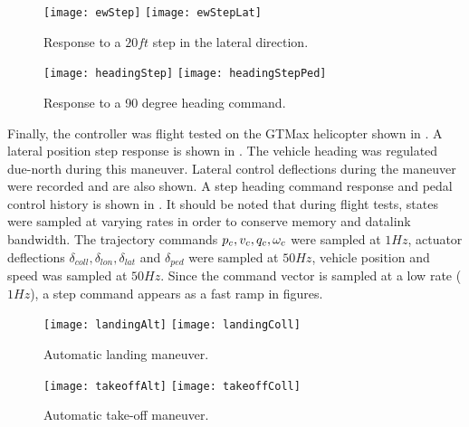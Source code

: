 \begin{figure}
  \begin{center}
  \texttt{[image: ewStep]}
  \texttt{[image: ewStepLat]}
  \caption{Response to a $20 ft$ step in the lateral direction.}
  \label{f:ewStep}
  \end{center}
\end{figure}
%
\begin{figure}
  \begin{center}
  \texttt{[image: headingStep]}
  \texttt{[image: headingStepPed]}
  \caption{Response to a 90 degree heading command.}
  \label{f:headingStep}
  \end{center}
\end{figure}
Finally, the controller was flight tested on the GTMax helicopter
shown in . A lateral position step response is shown
in .  The vehicle heading was regulated due-north
during this maneuver. Lateral control deflections during the
maneuver were recorded and are also shown. A step heading command
response and pedal control history is shown in . It should be noted that during
flight tests, states were sampled at varying rates in order to
conserve memory and datalink bandwidth. The trajectory commands
$p_c,v_c,q_c,\omega_c$ were sampled at $1 Hz$, actuator deflections
$\delta_{coll},\delta_{lon},\delta_{lat}$ and $\delta_{ped}$ were
sampled at $50 Hz$, vehicle position and speed was sampled at $50
Hz$. Since the command vector is sampled at a low rate ($1 Hz$), a
step command appears as a fast ramp in figures.

\begin{figure}
  \begin{center}
  \texttt{[image: landingAlt]}
  \texttt{[image: landingColl]}
  \caption{Automatic landing maneuver.}
  \label{f:landing}
  \end{center}
\end{figure}
%
\begin{figure}
  \begin{center}
  \texttt{[image: takeoffAlt]}
  \texttt{[image: takeoffColl]}
  \caption{Automatic take-off maneuver.}
  \label{f:takeoff}
  \end{center}
\end{figure}

